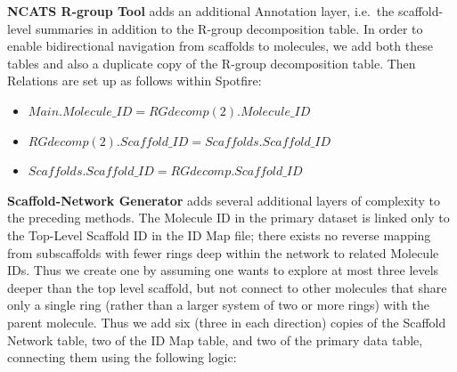 \documentclass[journal=jacsat,manuscript=article]{achemso}
\newcommand*\ie{i.e.~}
\begin{document}
{\bf NCATS R-group Tool} adds an additional Annotation layer, \ie the scaffold-level summaries in addition to the R-group decomposition table. In order to enable bidirectional navigation from scaffolds to molecules, we add both these tables and also a duplicate copy of the R-group decomposition table. Then Relations are set up as follows within Spotfire:
\begin{itemize}
\item $Main.Molecule\_ID = RGdecomp(2).Molecule\_ID$
\item $RGdecomp(2).Scaffold\_ID = Scaffolds.Scaffold\_ID$
\item $Scaffolds.Scaffold\_ID = RGdecomp.Scaffold\_ID$
\end{itemize}   

{\bf Scaffold-Network Generator} adds several additional layers of
complexity to the preceding methods. The Molecule ID in the primary
dataset is linked only to the Top-Level Scaffold ID in the ID Map
file; there exists no reverse mapping from subscaffolds with fewer
rings deep within the network to related Molecule IDs. Thus we create
one by assuming one wants to explore at most three levels deeper than
the top level scaffold, but not connect to other molecules that share
only a single ring (rather than a larger system of two or more rings)
with the parent molecule. Thus we add six (three in each direction)
copies of the Scaffold Network table, two of the ID Map table, and two
of the primary data table, connecting them using the following logic:
\end{document}
